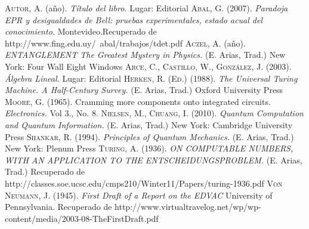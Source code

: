 \documentclass[11pt,a4paper]{article}
\begin{document}
\clearpage
\begin{thebibliography}{X}
 \textsc{Autor, A.} (año). \textit{Título del libro.} Lugar: Editorial
 \textsc{Abal, G.} (2007). \textit{Paradoja EPR y desigualdades de Bell: pruebas experimentales, estado acual del conocimiento.} Montevideo.Recuperado de http://www.fing.edu.uy/~abal/trabajos/tdet.pdf
 \textsc{Aczel, A.} (año). \textit{ENTANGLEMENT The Greatest Mystery in Physics.} (E. Arias, Trad.) New York: Four Wall Eight Windows
 \textsc{Arce, C., Castillo, W., González, J.} (2003). \textit{Álgebra Lineal.} Lugar: Editorial
 \textsc{Herken, R. (Ed.)} (1988). \textit{The Universal Turing Machine. A Half-Century Survey.} (E. Arias, Trad.) Oxford University Press
 \textsc{Moore, G.} (1965). Cramming more components onto integrated circuits. \textit{Electronics.} Vol 3., No. 8.
 \textsc{Nielsen, M., Chuang, I.} (2010). \textit{Quantum Computation and Quantum Information.} (E. Arias, Trad.) New York: Cambridge University Press
 \textsc{Shankar, R.} (1994). \textit{Principles of Quantum Mechanics.} (E. Arias, Trad.) New York: Plenum Press
 \textsc{Turing, A.} (1936). \textit{ON COMPUTABLE NUMBERS, WITH AN APPLICATION TO
THE ENTSCHEIDUNGSPROBLEM.} (E. Arias, Trad.) Recuperado de http://classes.soe.ucsc.edu/cmps210/Winter11/Papers/turing-1936.pdf
 \textsc{Von Neumann, J.} (1945). \textit{First Draft of a Report on the EDVAC} University of Pennsylvania. Recuperado de http://www.virtualtravelog.net/wp/wp-content/media/2003-08-TheFirstDraft.pdf
\end{thebibliography}
\end{document}
